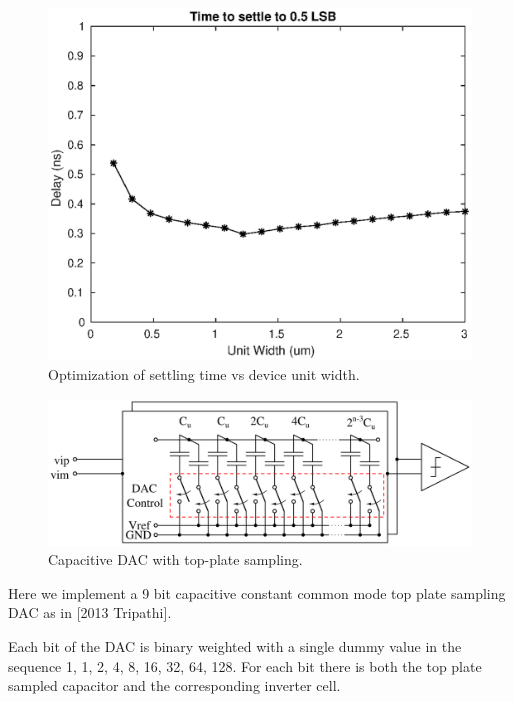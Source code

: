 \documentclass[10pt,journal]{IEEEtran}\usepackage{longtable}
\begin{document}
\begin{figure}[tbph]
\begin{center}
\includegraphics[width=1\columnwidth]{dac_optimization.eps}
\caption{Optimization of settling time vs device unit width.}
\label{fig:DacOptimization}
\end{center}
\end{figure}
\begin{figure}[tbph]
\begin{center}
\includegraphics[width=1\columnwidth]{CapDacV3.pdf}
\caption{Capacitive DAC with top-plate sampling.}
\label{fig:CapDac}
\end{center}
\end{figure}

Here we implement a 9 bit capacitive constant common mode top plate sampling DAC as in [2013 Tripathi].

Each bit of the DAC is binary weighted with a single dummy value in the
sequence 1, 1, 2, 4, 8, 16, 32, 64, 128.
For each bit there is both the top plate sampled capacitor and the corresponding inverter cell.
\end{document}
